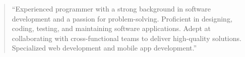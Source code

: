 \documentclass[10pt,a4paper,ragged2e,withhyper]{altacv}
\begin{document}
\begin{paracol}{2}
\newpage









\switchcolumn

\begin{quote}
``Experienced programmer with a strong background in software development and a passion for problem-solving. Proficient in designing, coding, testing, and maintaining software applications. Adept at collaborating with cross-functional teams to deliver high-quality solutions. Specialized web development and mobile app development.''
\end{quote}



\divider


\divider


\end{paracol}
\end{document}

